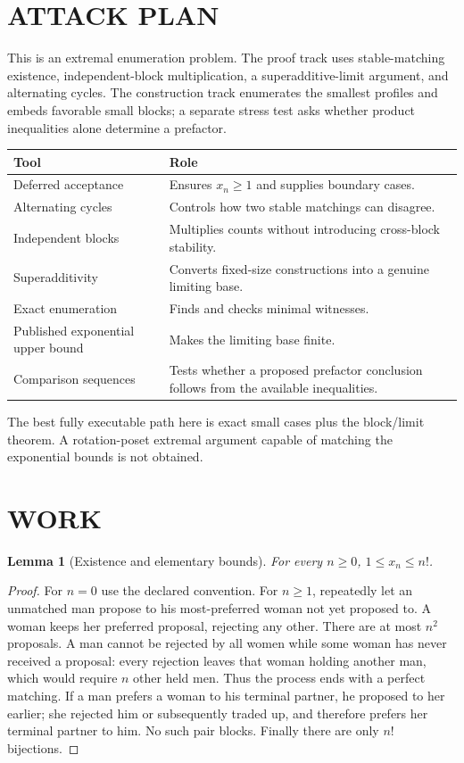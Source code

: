 \documentclass[11pt,a4paper]{article}
\newtheorem{lemma}[theorem]{Lemma}
\theoremstyle{remark}\newtheorem{remark}[theorem]{Remark}
\begin{document}
\section{ATTACK PLAN}
This is an extremal enumeration problem. The proof track uses stable-matching existence, independent-block multiplication, a superadditive-limit argument, and alternating cycles. The construction track enumerates the smallest profiles and embeds favorable small blocks; a separate stress test asks whether product inequalities alone determine a prefactor.

\begin{center}\begin{tabular}{p{.24\linewidth}p{.67\linewidth}}\toprule
Tool & Role \\\midrule
Deferred acceptance & Ensures $x_n\ge1$ and supplies boundary cases.\\
Alternating cycles & Controls how two stable matchings can disagree.\\
Independent blocks & Multiplies counts without introducing cross-block stability.\\
Superadditivity & Converts fixed-size constructions into a genuine limiting base.\\
Exact enumeration & Finds and checks minimal witnesses.\\
Published exponential upper bound & Makes the limiting base finite.\\
Comparison sequences & Tests whether a proposed prefactor conclusion follows from the available inequalities.\\\bottomrule
\end{tabular}\end{center}
The best fully executable path here is exact small cases plus the block/limit theorem. A rotation-poset extremal argument capable of matching the exponential bounds is not obtained.

\section{WORK}
\begin{lemma}[Existence and elementary bounds]
For every $n\ge0$, $1\le x_n\le n!$.
\end{lemma}
\begin{proof}
For $n=0$ use the declared convention. For $n\ge1$, repeatedly let an unmatched man propose to his most-preferred woman not yet proposed to. A woman keeps her preferred proposal, rejecting any other. There are at most $n^2$ proposals. A man cannot be rejected by all women while some woman has never received a proposal: every rejection leaves that woman holding another man, which would require $n$ other held men. Thus the process ends with a perfect matching. If a man prefers a woman to his terminal partner, he proposed to her earlier; she rejected him or subsequently traded up, and therefore prefers her terminal partner to him. No such pair blocks. Finally there are only $n!$ bijections.
\end{proof}
\end{document}
